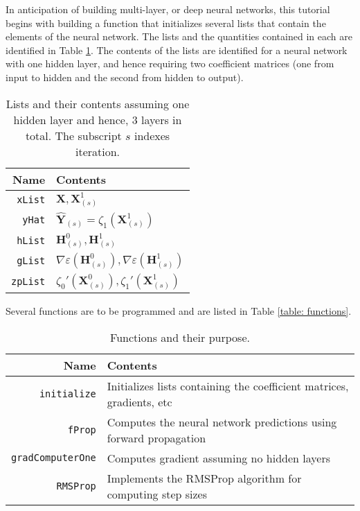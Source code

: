 \documentclass[graybox,envcountchap]{svmono}
\newcommand{\Yf}{\mathbf{Y}}
\newcommand{\Xf}{\mathbf{X}}
\newcommand{\Hf}{\mathbf{H}}
\newcommand{\nn}{neural network}
\newcommand{\w}{\widehat}
\newcommand{\tx}{\texttt}
\begin{document}
In anticipation of building multi-layer, or deep \nn s, this tutorial begins with building a function that initializes several lists that contain the elements of the {\nn }. The lists and the quantities contained in each are identified in Table \ref{table:lists}. The contents of the lists are identified for a {\nn } with one hidden layer, and hence requiring two coefficient matrices (one from input to hidden and the second from hidden to output). 

\begin{table}
\caption{Lists and their contents assuming one hidden layer and hence, 3 layers in total. The subscript $s$ indexes iteration.}\label{table:lists} \centering
 \begin{tabular}{r|l }
  Name & Contents \\ \hline
  \tx{xList} & $\Xf, \Xf^1_{(s)}$\\
  \tx{yHat} &  $\w{\Yf}_{(s)} = \zeta_1(\Xf_{(s)}^1)$ \\
  \tx{hList} & $\Hf^0_{(s)},\Hf^1_{(s)}$ \\
  \tx{gList} & $\nabla \varepsilon (\Hf^0_{(s)}), \nabla \varepsilon(\Hf^1_{(s)})$ \\
  \tx{zpList} & $\zeta_0'(\Xf_{(s)}^0), \zeta_1'(\Xf^1_{(s)})$
 \end{tabular}
\end{table}

Several functions are to be programmed and are listed in Table \ref{table: functions}.

\begin{table}
\caption{Functions and their purpose.}\label{table:functions} \centering
 \begin{tabular}{r|l }
  Name & Contents \\ \hline
  \tx{initialize} & Initializes lists containing the coefficient matrices, gradients, etc\\
  \tx{fProp} & Computes the {\nn } predictions using forward propagation\\
  \tx{gradComputerOne} &  Computes gradient assuming no hidden layers\\
  \tx{RMSProp} & Implements the RMSProp algorithm for computing step sizes\\
 \end{tabular}
\end{table}
\end{document}
